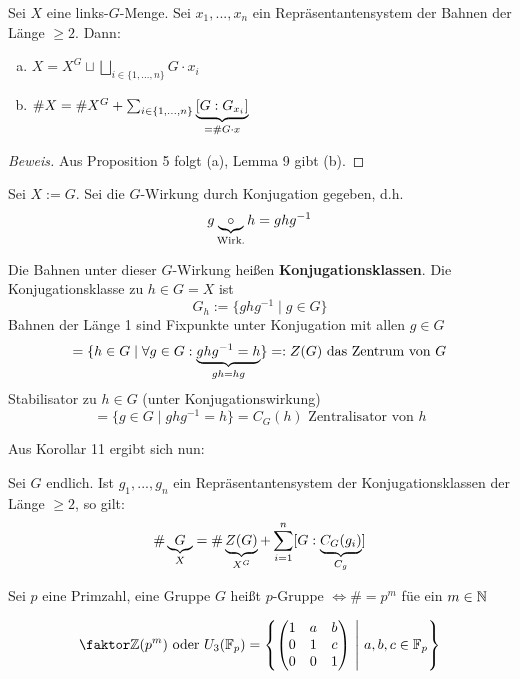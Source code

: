 \documentclass[a4paper]{report}
\begin{document}
\begin{kor}
  Sei $X$ eine links-$G$-Menge. Sei $x_{1}, ..., x_{n}$ ein Repräsentantensystem der Bahnen der Länge $\ge 2$. Dann:
  \begin{enumerate}[(a)]
  \item \(X = X^{G} \sqcup \bigsqcup_{i \in \{1, ..., n\}} G \cdot x_{i}\)
  \item \(\# X = \# X^{G} + \sum_{i \in \{1, ..., n\}}\underbrace{[G:G_{x_{i}}]}_{=\#G \cdot x}\)
  \end{enumerate}
\end{kor}
\begin{proof}[Beweis]
Aus Proposition 5 folgt (a), Lemma 9 gibt (b).
\end{proof}
\begin{anw*}
Sei $X:= G$. Sei die $G$-Wirkung durch Konjugation gegeben, d.h. \[g \underbrace {\circ}_{\text{Wirk.}} h = ghg^{-1}\]
Die Bahnen unter dieser $G$-Wirkung heißen \textbf{Konjugationsklassen}. Die Konjugationsklasse zu $h \in G = X$ ist \[G_{h} := \{ghg^{-1} \mid g \in G\}\]
Bahnen der Länge 1 sind Fixpunkte unter Konjugation mit allen $g \in G$
\[= \{h \in G \mid \forall g \in G : \underbrace{ghg^{-1} = h}_{gh = hg} \} =: Z(G) \text{ das Zentrum von }G\]
Stabilisator zu $h \in G$ (unter Konjugationswirkung)
\[ = \{g \in G \mid ghg^{-1} = h\} = C_{G}(h) \text{ Zentralisator von } h\]
\end{anw*}
Aus Korollar 11 ergibt sich nun:

\begin{satz}[Klassengleichung]
  Sei $G$ endlich. Ist $g_{1}, ..., g_{n}$ ein Repräsentantensystem der Konjugationsklassen der Länge $\ge 2$, so gilt:
  \[\# \underbrace{G}_{X} = \#\underbrace{Z(G)}_{X^{G}} + \sum_{i = 1}^{n}[G : \underbrace{C_{G}(g_{i})}_{C_{g}}]\]
\end{satz}

\begin{defi}
Sei $p$ eine Primzahl, eine Gruppe $G$ heißt $p$-Gruppe $\iff \# = p^{m}$ füe ein $m \in \mathbb{N}$
\end{defi}
\begin{bsp*}
  \[\fak \Z{(p^{m})} \text{ oder } U_{3}(\Bbb F_{p}) =
    \l\{\begin{pmatrix}
      1 & a & b \\
      0 & 1 & c \\
      0 & 0 & 1
  \end{pmatrix} \ \middle | \ a, b, c \in \Bbb F_{p} \r\}\]
\end{bsp*}
\end{document}
